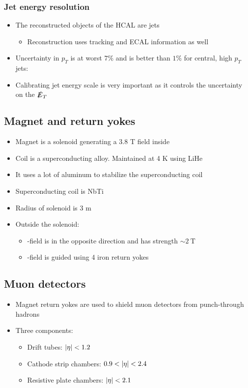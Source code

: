 \subsubsection{Jet energy resolution}
\begin{itemize}
  \item The reconstructed objects of the HCAL are jets
  \begin{itemize}
    \item Reconstruction uses tracking and ECAL information as well
  \end{itemize}
  \item Uncertainty in $p_T$ is at worst $7\%$ and is better than $1\%$ for central, high $p_T$ jets:
  \item Calibrating jet energy scale is very important as it controls the uncertainty on the $\slashed E_T$
\end{itemize}

\subsection{Magnet and return yokes}
\begin{itemize}
  \item Magnet is a solenoid generating a 3.8 T field inside
  \item Coil is a superconducting alloy. Maintained at 4 K using LiHe
  \item It uses a lot of aluminum to stabilize the superconducting coil
  \item Superconducting coil is NbTi
  \item Radius of solenoid is 3 m
  \item Outside the solenoid:
  \begin{itemize}
    \item \B-field is in the opposite direction and has strength $\sim 2~\text{T}$
    \item \B-field is guided using 4 iron return yokes
  \end{itemize}
\end{itemize}

\subsection{Muon detectors}
\begin{itemize}
  \item Magnet return yokes are used to shield muon detectors from punch-through hadrons
  \item Three components:
  \begin{itemize}
    \item Drift tubes: $|\eta|<1.2$
    \item Cathode strip chambers: $0.9<\abseta<2.4$
    \item Resistive plate chambers: $|\eta|<2.1$
  \end{itemize}
\end{itemize}

